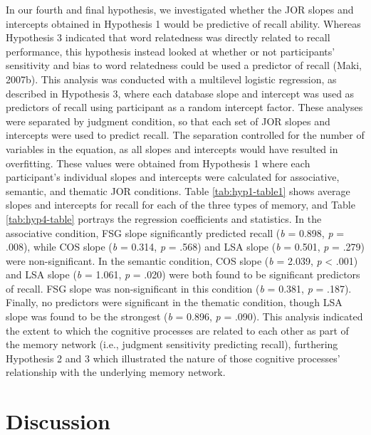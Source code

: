 \documentclass[english,man]{apa6}
\theoremstyle{definition}
\theoremstyle{definition}
\theoremstyle{definition}
\theoremstyle{remark}
\begin{document}
In our fourth and final hypothesis, we investigated whether the JOR
slopes and intercepts obtained in Hypothesis 1 would be predictive of
recall ability. Whereas Hypothesis 3 indicated that word relatedness was
directly related to recall performance, this hypothesis instead looked
at whether or not participants' sensitivity and bias to word relatedness
could be used a predictor of recall (Maki, 2007b). This analysis was
conducted with a multilevel logistic regression, as described in
Hypothesis 3, where each database slope and intercept was used as
predictors of recall using participant as a random intercept factor.
These analyses were separated by judgment condition, so that each set of
JOR slopes and intercepts were used to predict recall. The separation
controlled for the number of variables in the equation, as all slopes
and intercepts would have resulted in overfitting. These values were
obtained from Hypothesis 1 where each participant's individual slopes
and intercepts were calculated for associative, semantic, and thematic
JOR conditions. Table \ref{tab:hyp1-table1} shows average slopes and
intercepts for recall for each of the three types of memory, and Table
\ref{tab:hyp4-table} portrays the regression coefficients and
statistics. In the associative condition, FSG slope significantly
predicted recall (\emph{b} = 0.898, \emph{p} = .008), while COS slope
(\emph{b} = 0.314, \emph{p} = .568) and LSA slope (\emph{b} = 0.501,
\emph{p} = .279) were non-significant. In the semantic condition, COS
slope (\emph{b} = 2.039, \emph{p} \textless{} .001) and LSA slope
(\emph{b} = 1.061, \emph{p} = .020) were both found to be significant
predictors of recall. FSG slope was non-significant in this condition
(\emph{b} = 0.381, \emph{p} = .187). Finally, no predictors were
significant in the thematic condition, though LSA slope was found to be
the strongest (\emph{b} = 0.896, \emph{p} = .090). This analysis
indicated the extent to which the cognitive processes are related to
each other as part of the memory network (i.e., judgment sensitivity
predicting recall), furthering Hypothesis 2 and 3 which illustrated the
nature of those cognitive processes' relationship with the underlying
memory network.

\section{Discussion}\label{discussion}
\end{document}
